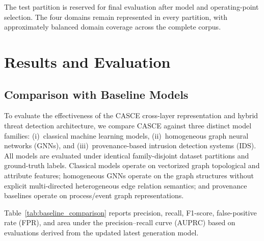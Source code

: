 \documentclass[conference]{IEEEtran}
\begin{document}
The test partition is reserved for final evaluation after model and
operating-point selection. The four domains remain represented in every
partition, with approximately balanced domain coverage across the complete
corpus.

\section{Results and Evaluation}

\subsection{Comparison with Baseline Models}
\label{subsec:baseline_comparison}

To evaluate the effectiveness of the CASCE cross-layer representation and hybrid threat detection architecture, we compare CASCE against three distinct model families: (i)~classical machine learning models, (ii)~homogeneous graph neural networks (GNNs), and (iii)~provenance-based intrusion detection systems (IDS). All models are evaluated under identical family-disjoint dataset partitions and ground-truth labels. Classical models operate on vectorized graph topological and attribute features; homogeneous GNNs operate on the graph structures without explicit multi-directed heterogeneous edge relation semantics; and provenance baselines operate on process/event graph representations.

Table~\ref{tab:baseline_comparison} reports precision, recall, F1-score, false-positive rate (FPR), and area under the precision--recall curve (AUPRC) based on evaluations derived from the updated latest generation model.
\end{document}
